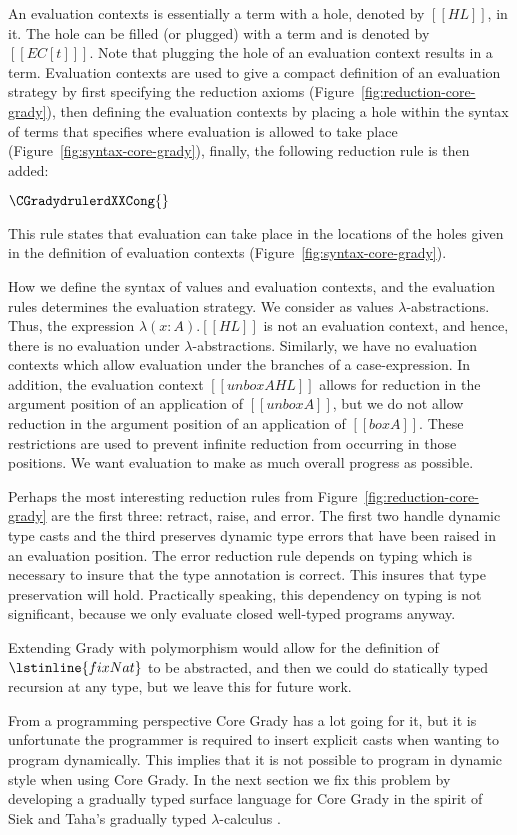 An evaluation contexts is essentially a term with a hole, denoted by
$[[HL]]$, in it.  The hole can be filled (or plugged) with a term and
is denoted by $[[EC[t] ]]$.  Note that plugging the hole of an
evaluation context results in a term.  Evaluation contexts are used to
give a compact definition of an evaluation strategy by first specifying
the reduction axioms (Figure~\ref{fig:reduction-core-grady}), then
defining the evaluation contexts by placing a hole within the syntax
of terms that specifies where evaluation is allowed to take place
(Figure~\ref{fig:syntax-core-grady}), finally, the following reduction
rule is then added:
\begin{center}\small
  \begin{math}
    \CGradydrulerdXXCong{}
  \end{math}
\end{center}
This rule states that evaluation can take place in the locations of
the holes given in the definition of evaluation contexts
(Figure~\ref{fig:syntax-core-grady}).

How we define the syntax of values and evaluation contexts, and the
evaluation rules determines the evaluation strategy.  We consider as
values $\lambda$-abstractions. Thus, the expression $\lambda
(x:A).[[HL]]$ is not an evaluation context, and hence, there is no
evaluation under $\lambda$-abstractions.  Similarly, we have no
evaluation contexts which allow evaluation under the branches of a
case-expression.  In addition, the evaluation context $[[unbox A HL]]$
allows for reduction in the argument position of an application of
$[[unbox A]]$, but we do not allow reduction in the argument position
of an application of $[[box A]]$. These restrictions are used to
prevent infinite reduction from occurring in those positions.  We want
evaluation to make as much overall progress as possible.

Perhaps the most interesting reduction rules from
Figure~\ref{fig:reduction-core-grady} are the first three: retract,
raise, and error.  The first two handle dynamic type casts and the
third preserves dynamic type errors that have been raised in an
evaluation position.  The error reduction rule depends on typing which
is necessary to insure that the type annotation is correct.  This
insures that type preservation will hold.  Practically speaking, this
dependency on typing is not significant, because we only evaluate
closed well-typed programs anyway.

Extending Grady with polymorphism would allow for the definition of
$\lstinline{fixNat}$ to be abstracted, and then we could do statically
typed recursion at any type, but we leave this for future work.

From a programming perspective Core Grady has a lot going for it, but
it is unfortunate the programmer is required to insert explicit casts
when wanting to program dynamically.  This implies that it is not
possible to program in dynamic style when using Core Grady.  In the
next section we fix this problem by developing a gradually typed
surface language for Core Grady in the spirit of Siek and Taha's
gradually typed $\lambda$-calculus \cite{Siek:2006,Siek:2015}.

